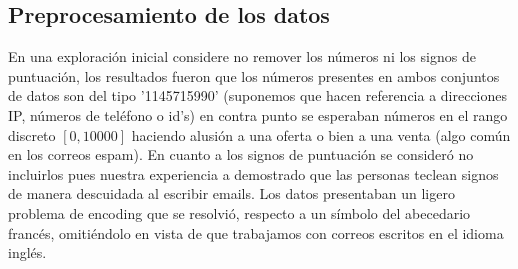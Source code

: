 \documentclass[paper=letter, fontsize=11pt]{scrartcl}
\numberwithin{equation}{section} %
\numberwithin{figure}{section} %
\numberwithin{table}{section} %
\begin{document}
\subsection{Preprocesamiento de los datos }
En una exploración inicial considere no remover los números ni los signos de puntuación, los resultados fueron que los números presentes en ambos conjuntos de datos son del tipo '1145715990' (suponemos que hacen referencia a direcciones IP, números de teléfono o id's) en contra punto se esperaban números en el rango discreto $[0,10000]$ haciendo alusión a una oferta o bien a una venta (algo común en los correos espam). En cuanto a los signos de puntuación se consideró no incluirlos pues nuestra experiencia a demostrado que las personas teclean signos de manera descuidada al escribir emails. Los datos presentaban un ligero problema de encoding que se resolvió, respecto a un símbolo del abecedario francés, omitiéndolo en vista de que trabajamos con correos escritos en el idioma inglés.\\
\end{document}
